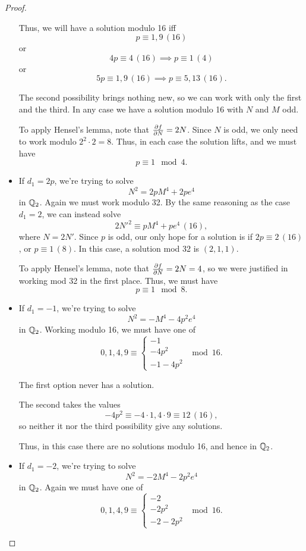\documentclass[12pt, a4paper]{report}
\begin{document}
\begin{proof}
\begin{itemize}
    Thus, we will have a solution modulo 16 iff
    \[p \equiv 1,9 \, (16)\]
    or
    \[4p \equiv 4 \, (16) \implies p \equiv 1 \, (4)\]
    or
    \[5p \equiv 1, 9 \, (16) \implies p \equiv 5, 13 \, (16). \] 
    
    The second possibility brings nothing new, so we can work with only the
    first and the third. In any case we have a solution modulo 16 with $N$ and
    $M$ odd.

    To apply Hensel's lemma, note that $\frac{\partial f}{\partial N} = 2N$. Since $N$ is odd,
    we only need to work modulo $2^2 \cdot 2 = 8$. Thus, in each
    case the solution lifts, and we must have
    \[p \equiv 1 \mod{4}.\]
    
    \item If $d_1 = 2p$, we're trying to solve
      \[N^2 = 2pM^4 + 2pe^4 \] in ${\mathbb Q}_2$. Again we must work modulo 32. By
      the same reasoning as the case $d_1 = 2$, we can instead solve
      \[2N'^2 \equiv pM^4 + pe^4 \, (16),\]
      where $N = 2N'.$ Since $p$ is odd, our only hope for a solution is
      if $2p \equiv 2 \,(16)$, or $p \equiv 1 \, (8).$ In this case, a solution
      mod 32 is $(2, 1,1).$

      To apply Hensel's lemma, note that $\frac{\partial f}{\partial N} = 2N = 4$, so we were
      justified in working mod 32 in the first place. Thus, we must have
      \[p \equiv 1 \mod{8}.\]
      
    \item If $d_1 = -1$, we're trying to solve
    \[N^2 = -M^4 - 4p^2e^4 \] in ${\mathbb Q}_2$. 
    Working modulo 16, we must have one of
    \[0, 1, 4, 9 \equiv
      \begin{cases}
        -1 \\
        -4p^2 \\
        -1-4p^2
      \end{cases} \mod{16}.
    \]

    The first option never has a solution.

    The second takes the values
    \[-4p^2 \equiv -4\cdot 1, 4 \cdot 9 \equiv 12 \, (16),\]
    so neither it nor the third possibility give any solutions.

    Thus, in this case there are no solutions modulo 16, and hence in ${\mathbb Q}_2$.


    \item If $d_1 = -2$, we're trying to solve
    \[N^2 = -2M^4 - 2p^2e^4 \] in ${\mathbb Q}_2$. 
    Again we must have one of
    \[0, 1, 4, 9 \equiv
      \begin{cases}
        -2 \\
        -2p^2 \\
        -2-2p^2
      \end{cases} \mod{16}.
    \]


\end{itemize}
\end{proof}
\end{document}
